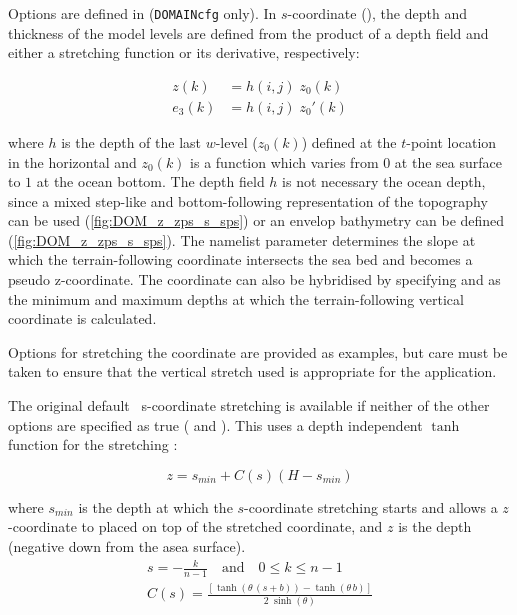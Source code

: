 \documentclass[../main/NEMO_manual]{subfiles}
\begin{document}
Options are defined in  (\texttt{DOMAINcfg} only).
In $s$-coordinate (), the depth and thickness of the model levels are defined from
the product of a depth field and either a stretching function or its derivative, respectively:

\begin{align*}
  z(k)   &= h(i,j) \; z_0 (k) \\
  e_3(k) &= h(i,j) \; z_0'(k)
\end{align*}

where $h$ is the depth of the last $w$-level ($z_0(k)$) defined at the $t$-point location in the horizontal and
$z_0(k)$ is a function which varies from $0$ at the sea surface to $1$ at the ocean bottom.
The depth field $h$ is not necessary the ocean depth,
since a mixed step-like and bottom-following representation of the topography can be used
(\autoref{fig:DOM_z_zps_s_sps}) or an envelop bathymetry can be defined (\autoref{fig:DOM_z_zps_s_sps}).
The namelist parameter  determines the slope at which
the terrain-following coordinate intersects the sea bed and becomes a pseudo z-coordinate.
The coordinate can also be hybridised by specifying  and  as
the minimum and maximum depths at which the terrain-following vertical coordinate is calculated.

Options for stretching the coordinate are provided as examples,
but care must be taken to ensure that the vertical stretch used is appropriate for the application.

The original default \NEMO\ s-coordinate stretching is available if neither of the other options are specified as true
( and ).
This uses a depth independent $\tanh$ function for the stretching \citep{madec.delecluse.ea_JPO96}:

\[
  z = s_{min} + C (s) (H - s_{min})
\]

where $s_{min}$ is the depth at which the $s$-coordinate stretching starts and
allows a $z$-coordinate to placed on top of the stretched coordinate,
and $z$ is the depth (negative down from the asea surface).
\begin{gather*}
  s = - \frac{k}{n - 1} \quad \text{and} \quad 0 \leq k \leq n - 1
 \\
 \label{eq:DOMCFG_sco_function}
  C(s) = \frac{[\tanh(\theta \, (s + b)) - \tanh(\theta \, b)]}{2 \; \sinh(\theta)}
\end{gather*}
\end{document}
